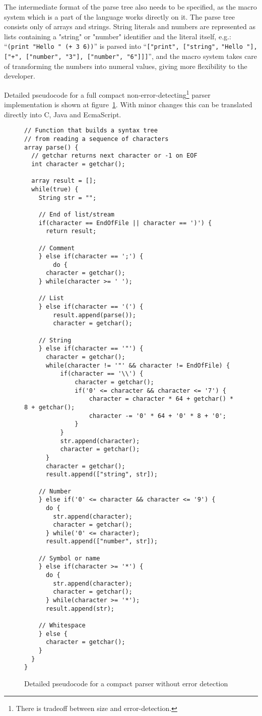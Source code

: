 The intermediate format of the parse tree also needs to be specified, as the macro system which is a part of the language works directly on it. 
The parse tree consists only of arrays and strings. String literals and numbers are represented as lists containing a "string" or "number" identifier and the literal itself, e.g.: ``\verb|(print "Hello " (+ 3 6))|'' is parsed into ``\verb|["print", ["string",| \verb|"Hello "],| \verb|["+", ["number", "3"], ["number", "6"]]]|'', and the macro system takes care of transforming the numbers into numeral values, giving more flexibility to the developer.

Detailed pseudocode for a full compact non-error-detecting\footnote{There is tradeoff between size and error-detection.} parser implementation is shown at figure~\ref{parsercode}. With minor changes this can be translated directly into C, Java and EcmaScript.
\begin{figure}
{\scriptsize
\begin{verbatim}
// Function that builds a syntax tree 
// from reading a sequence of characters
array parse() {
  // getchar returns next character or -1 on EOF
  int character = getchar(); 

  array result = [];
  while(true) {
    String str = "";

    // End of list/stream
    if(character == EndOfFile || character == ')') {
      return result;

    // Comment
    } else if(character == ';') {
        do {
	  character = getchar();
	} while(character >= ' ');

    // List
    } else if(character == '(') {
        result.append(parse());
        character = getchar();

    // String
    } else if(character == '"') {
      character = getchar();
      while(character != '"' && character != EndOfFile) {
          if(character == '\\') {
              character = getchar();
              if('0' <= character && character <= '7') {
                  character = character * 64 + getchar() * 8 + getchar();
                  character -= '0' * 64 + '0' * 8 + '0';
              }
          }
          str.append(character);
          character = getchar();
      }
      character = getchar();
      result.append(["string", str]);

    // Number
    } else if('0' <= character && character <= '9') {
      do {
        str.append(character);
        character = getchar();
      } while('0' <= character);
      result.append(["number", str]);

    // Symbol or name
    } else if(character >= '*') {
      do {
        str.append(character);
        character = getchar();
      } while(character >= '*');
      result.append(str);

    // Whitespace
    } else {
      character = getchar();
    }
  }
}
\end{verbatim}
}
\caption{Detailed pseudocode for a compact parser without error detection}
\label{parsercode}
\end{figure}
